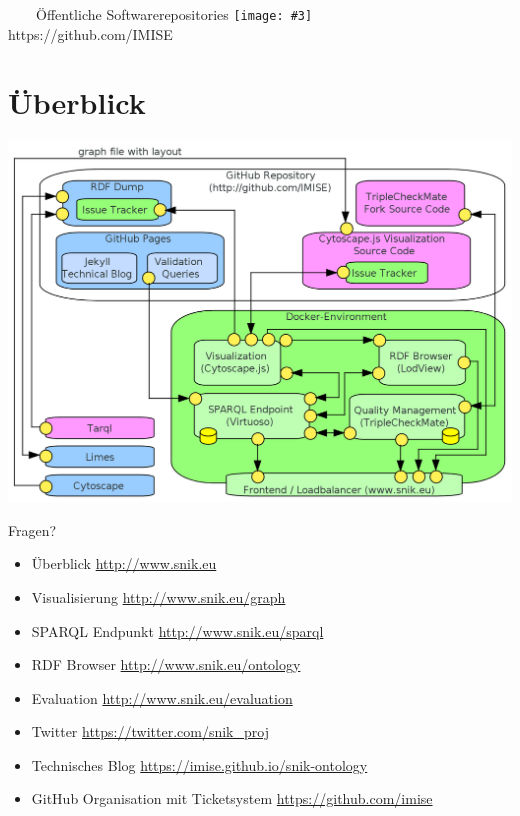 \documentclass[aspectratio=1610,12pt]{beamer}
\newcommand{\imageslide}[4][]                                                                                                                                                                                                                                                                                                 
{
\newgeometry{margin=0cm,top=1em}
\begin{frame}[plain]{~~~~#2}
\vspace{0.2em}
\centering\texttt{[image: \#3]}
\\#1
\note{#4}
\end{frame}
\restoregeometry
}
\begin{document}
\imageslide[https://github.com/IMISE]{Öffentliche Softwarerepositories}{img/github.png}{}{}

\section{Überblick}

\begin{frame}
\includegraphics[width=\textwidth]{img/architecture.png}
\end{frame}

\begin{frame}[fragile]{Fragen?}
\begin{itemize}
\vspace{0.5em}%
\item Überblick \url{http://www.snik.eu}
\item Visualisierung \url{http://www.snik.eu/graph}
\item SPARQL Endpunkt \url{http://www.snik.eu/sparql}
\item RDF Browser \url{http://www.snik.eu/ontology}
\item Evaluation \url{http://www.snik.eu/evaluation}
\item Twitter \url{https://twitter.com/snik\_proj}
\item Technisches Blog \url{https://imise.github.io/snik-ontology}
\item GitHub Organisation mit Ticketsystem \url{https://github.com/imise}
\end{itemize}
\end{frame}
\end{document}
